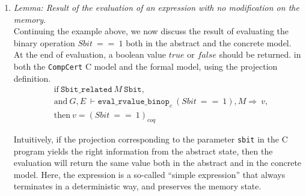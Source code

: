 \documentclass[twocolumn]{article}
\newcommand{\compcert}{\texttt{CompCert}\xspace}
\begin{document}
\begin{enumerate}
Now, in our example, expression $a_1$ is the value of $Sbit$ and $a_2$
is the constant value $1$.  By inverting the hypothesis of type
\texttt{eval\_binop}, we obtain several new hypotheses, including on
the evaluation of the two subexpressions and the introduction of an
intermediate memory state $M''$.  Evaluating them has no change on the
C memory state.  Then we have $M = M'' = M'$.  In more detail, from
the \compcert C semantics definition, we know that, evaluation of an
expression will change the memory state if the evaluation contains
uses of \texttt{store\_value\_of\_type} (in \compcert versions before
1.11), which stores the value in memory at a given block reference and
memory chunk.  In \compcert-1.11, the basic store function on memory
is represented by an inductive type \texttt{assign\_loc} instead of
\texttt{store\_value\_of\_type}.  Since \compcert version 1.11
introduced volatile memory access, we have to determine whether the
object type is volatile before storage, and also type size in addition
of the access mode.
\item
\textit{Lemma: Result of the evaluation of an expression with no modification on the memory.}\\
Continuing the example above, we now discuss the result of evaluating
the binary operation $Sbit~==~1$ both in the abstract and the concrete model.
At the end of evaluation, a boolean value $true$ or $false$ should be returned.
in both the \compcert C model and the formal model,
using the projection definition.
\begin{align*}
&\textrm{if} ~ \texttt{Sbit\_related}~M~\texttt{Sbit},\\
&\textrm{and} ~ G,E~\vdash
        \texttt{eval\_rvalue\_binop}_c~(Sbit~==~1),M\Rightarrow~v,\\
&\textrm{then} ~ v=(Sbit~==~1)_{coq}
\end{align*}

Intuitively, if the projection corresponding to the parameter
\texttt{sbit} in the C program yields the right information from the
abstract state, then the evaluation will return the same value both in
the abstract and in the concrete model.  Here, the expression is a
so-called ``simple expression'' that always terminates in a
deterministic way, and preserves the memory state.


\end{enumerate}
\end{document}
